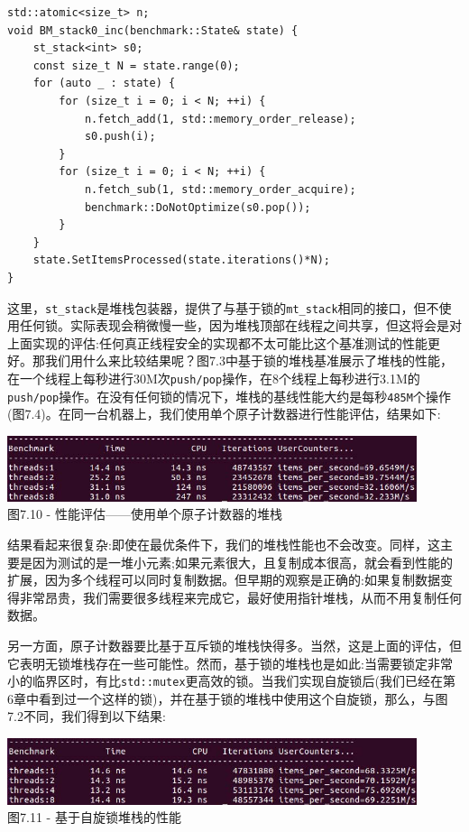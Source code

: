 \begin{lstlisting}[style=styleCXX]
std::atomic<size_t> n;
void BM_stack0_inc(benchmark::State& state) {
	st_stack<int> s0;
	const size_t N = state.range(0);
	for (auto _ : state) {
		for (size_t i = 0; i < N; ++i) {
			n.fetch_add(1, std::memory_order_release);
			s0.push(i);
		}
		for (size_t i = 0; i < N; ++i) {
			n.fetch_sub(1, std::memory_order_acquire);
			benchmark::DoNotOptimize(s0.pop());
		}
	}
	state.SetItemsProcessed(state.iterations()*N);
}
\end{lstlisting}

这里，\texttt{st\_stack}是堆栈包装器，提供了与基于锁的\texttt{mt\_stack}相同的接口，但不使用任何锁。实际表现会稍微慢一些，因为堆栈顶部在线程之间共享，但这将会是对上面实现的评估:任何真正线程安全的实现都不太可能比这个基准测试的性能更好。那我们用什么来比较结果呢？图7.3中基于锁的堆栈基准展示了堆栈的性能，在一个线程上每秒进行30M次\texttt{push/pop}操作，在8个线程上每秒进行3.1M的\texttt{push/pop}操作。在没有任何锁的情况下，堆栈的基线性能大约是每秒\texttt{485M}个操作(图7.4)。在同一台机器上，我们使用单个原子计数器进行性能评估，结果如下:

\begin{center}
\includegraphics[width=0.9\textwidth]{content/2/chapter7/images/10.jpg}\\
图7.10 - 性能评估——使用单个原子计数器的堆栈
\end{center}

结果看起来很复杂:即使在最优条件下，我们的堆栈性能也不会改变。同样，这主要是因为测试的是一堆小元素;如果元素很大，且复制成本很高，就会看到性能的扩展，因为多个线程可以同时复制数据。但早期的观察是正确的:如果复制数据变得非常昂贵，我们需要很多线程来完成它，最好使用指针堆栈，从而不用复制任何数据。

另一方面，原子计数器要比基于互斥锁的堆栈快得多。当然，这是上面的评估，但它表明无锁堆栈存在一些可能性。然而，基于锁的堆栈也是如此:当需要锁定非常小的临界区时，有比\texttt{std::mutex}更高效的锁。当我们实现自旋锁后(我们已经在第6章中看到过一个这样的锁)，并在基于锁的堆栈中使用这个自旋锁，那么，与图7.2不同，我们得到以下结果:

\begin{center}
\includegraphics[width=0.9\textwidth]{content/2/chapter7/images/11.jpg}\\
图7.11 - 基于自旋锁堆栈的性能
\end{center}

